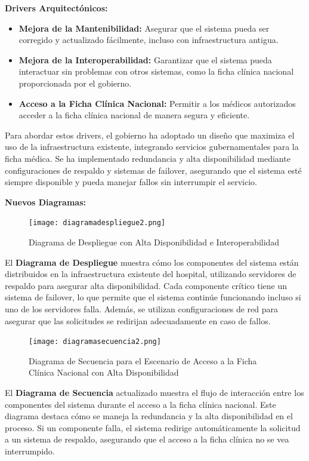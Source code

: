 \textbf{Drivers Arquitectónicos:}
\begin{itemize}
    \item \textbf{Mejora de la Mantenibilidad:} Asegurar que el sistema pueda ser corregido y actualizado fácilmente, incluso con infraestructura antigua.
    \item \textbf{Mejora de la Interoperabilidad:} Garantizar que el sistema pueda interactuar sin problemas con otros sistemas, como la ficha clínica nacional proporcionada por el gobierno.
    \item \textbf{Acceso a la Ficha Clínica Nacional:} Permitir a los médicos autorizados acceder a la ficha clínica nacional de manera segura y eficiente.
\end{itemize}

Para abordar estos drivers, el gobierno ha adoptado un diseño que maximiza el uso de la infraestructura existente, integrando servicios gubernamentales para la ficha médica. Se ha implementado redundancia y alta disponibilidad mediante configuraciones de respaldo y sistemas de failover, asegurando que el sistema esté siempre disponible y pueda manejar fallos sin interrumpir el servicio.

\textbf{Nuevos Diagramas:}

\begin{figure}[h]
    \centering
    \texttt{[image: diagramadespliegue2.png]}
    \caption{Diagrama de Despliegue con Alta Disponibilidad e Interoperabilidad}
    \label{fig:diagrama_despliegue2}
\end{figure}

El \textbf{Diagrama de Despliegue} muestra cómo los componentes del sistema están distribuidos en la infraestructura existente del hospital, utilizando servidores de respaldo para asegurar alta disponibilidad. Cada componente crítico tiene un sistema de failover, lo que permite que el sistema continúe funcionando incluso si uno de los servidores falla. Además, se utilizan configuraciones de red para asegurar que las solicitudes se redirijan adecuadamente en caso de fallos.

\begin{figure}[h]
    \centering
    \texttt{[image: diagramasecuencia2.png]}
    \caption{Diagrama de Secuencia para el Escenario de Acceso a la Ficha Clínica Nacional con Alta Disponibilidad}
    \label{fig:diagrama_secuencia2}
\end{figure}

El \textbf{Diagrama de Secuencia} actualizado muestra el flujo de interacción entre los componentes del sistema durante el acceso a la ficha clínica nacional. Este diagrama destaca cómo se maneja la redundancia y la alta disponibilidad en el proceso. Si un componente falla, el sistema redirige automáticamente la solicitud a un sistema de respaldo, asegurando que el acceso a la ficha clínica no se vea interrumpido.

